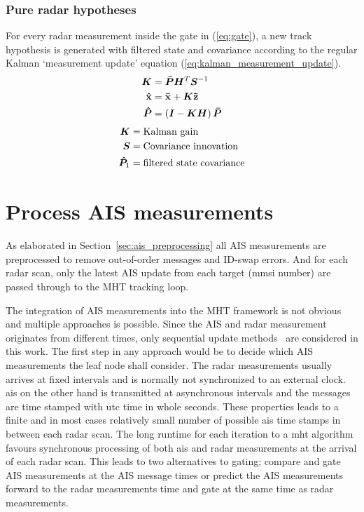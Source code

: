 \subsubsection{Pure radar hypotheses}
For every radar measurement inside the gate in (\ref{eq:gate}), a new track hypothesis is generated with filtered state and covariance according to the regular Kalman `measurement update' equation (\ref{eq:kalman_measurement_update}).
\begin{equation}\label{eq:kalman_measurement_update}
\begin{split}
\bm{K} 	&= \bm{\bar{P}} \bm{H}^T \bm{S}^{-1} \\
\boldsymbol{\mathbf{\hat{x}}} &= \boldsymbol{\mathbf{\bar{x}}} + \bm{K} \boldsymbol{\mathbf{\tilde{z}}} \\
\bm{\hat{P}} &= \left(\bm{I} - \bm{K} \bm{H} \right) \bm{\bar{P}} \\
\end{split}
\end{equation}
\begin{equation*}
\begin{split}
\bm{K}			&= \text{Kalman gain} \\
\bm{S}			&= \text{Covariance innovation} \\
\bm{\hat{P}}_1 	&= \text{filtered state covariance} \\
\end{split}
\end{equation*}

\section{Process AIS measurements}\label{sec:process_ais_measurements}
As elaborated in Section~\ref{sec:ais_preprocessing} all AIS measurements are preprocessed to remove out-of-order messages and ID-swap errors. And for each radar scan, only the latest AIS update from each target (\gls{mmsi} number) are passed through to the MHT tracking loop.

The integration of AIS measurements into the MHT framework is not obvious and multiple approaches is possible. Since the AIS and radar measurement originates from different times, only sequential update methods~\cite{Bar-Shalom1995} are considered in this work. The first step in any approach would be to decide which AIS measurements the leaf node shall consider. The radar measurements usually arrives at fixed intervals and is normally not synchronized to an external clock. \gls{ais} on the other hand is transmitted at asynchronous intervals and the messages are time stamped with \gls{utc} time in whole seconds. These properties leads to a finite and in most cases relatively small number of possible \gls{ais} time stamps in between each radar scan. The long runtime for each iteration to a \gls{mht} algorithm favours synchronous processing of both \gls{ais} and \gls{radar} measurements at the arrival of each radar scan. This leads to two alternatives to gating; compare and gate AIS measurements at the AIS message times or predict the AIS measurements forward to the radar measurements time and gate at the same time as radar measurements.

